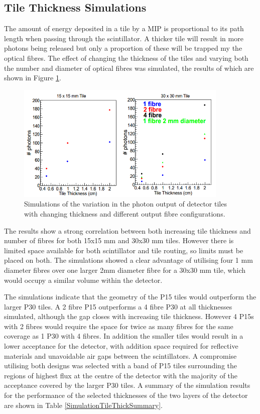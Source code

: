 \subsection{Tile Thickness Simulations}

The amount of energy deposited in a tile by a MIP is proportional to its path length when passing through the scintillator. A thicker tile will result in more photons being released but only a proportion of these will be trapped my the optical fibres. The effect of changing the thickness of the tiles and varying both the number and diameter of optical fibres was simulated, the results of which are shown in Figure \ref{SimulationTileThickness}.


\begin{figure}
	\centering
	\includegraphics[width=0.9\textwidth]{ImgChap1/tilesim}
	\caption{Simulations of the variation in the photon output of detector tiles with changing thickness and different output fibre configurations. \cite{FTTDR2012}}
	\label{SimulationTileThickness}
\end{figure}

The results show a strong correlation between both increasing tile thickness and number of fibres for both 15x15 mm and 30x30 mm tiles. However there is limited space available for both scintillator and tile routing, so limits must be placed on both. The simulations showed a clear advantage of utilising four 1 mm diameter fibres over one larger 2mm diameter fibre for a 30x30 mm tile, which would occupy a similar volume within the detector.

The simulations indicate that the geometry of the P15 tiles would outperform the larger P30 tiles. A 2 fibre P15 outperforms a 4 fibre P30 at all thicknesses simulated, although the gap closes with increasing tile thickness. However 4 P15s with 2 fibres would require the space for twice as many fibres for the same coverage as 1 P30 with 4 fibres. In addition the smaller tiles would result in a lower acceptance for the detector, with addition space required for reflective materials and unavoidable air gaps between the scintillators. A compromise utilising both designs was selected with a band of P15 tiles surrounding the regions of highest flux at the centre of the detector with the majority of the acceptance covered by the larger P30 tiles. A summary of the simulation results for the performance of the selected thicknesses of the two layers of the detector are shown in Table \ref{SimulationTileThickSummary}.

